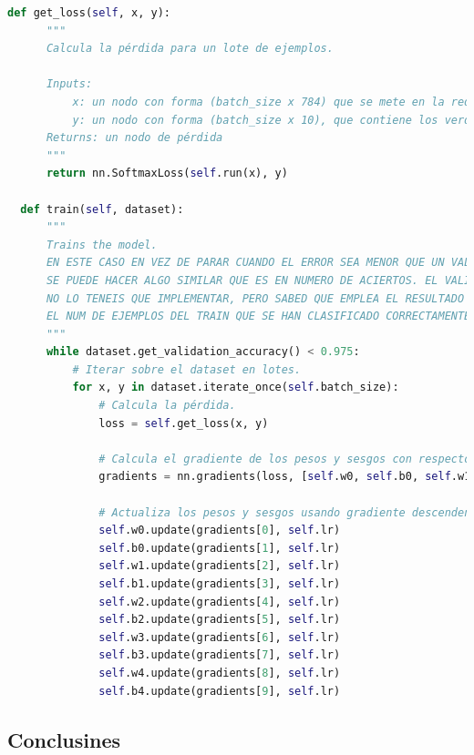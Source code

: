 \documentclass{report}
\begin{document}
\begin{lstlisting}[language=Python, caption=Implementación de la clasificación de dígitos]
  def get_loss(self, x, y):
      """
      Calcula la pérdida para un lote de ejemplos.
      
      Inputs:
          x: un nodo con forma (batch_size x 784) que se mete en la red para obtener las predicciones.
          y: un nodo con forma (batch_size x 10), que contiene los verdaderos valores y que se utilizarán para el entrenamiento.
      Returns: un nodo de pérdida
      """
      return nn.SoftmaxLoss(self.run(x), y) 
  
  def train(self, dataset):
      """
      Trains the model.
      EN ESTE CASO EN VEZ DE PARAR CUANDO EL ERROR SEA MENOR QUE UN VALOR O NO HAYA ERROR (CONVERGENCIA),
      SE PUEDE HACER ALGO SIMILAR QUE ES EN NUMERO DE ACIERTOS. EL VALIDATION ACCURACY
      NO LO TENEIS QUE IMPLEMENTAR, PERO SABED QUE EMPLEA EL RESULTADO DEL SOFTMAX PARA CALCULAR
      EL NUM DE EJEMPLOS DEL TRAIN QUE SE HAN CLASIFICADO CORRECTAMENTE 
      """
      while dataset.get_validation_accuracy() < 0.975:
          # Iterar sobre el dataset en lotes.
          for x, y in dataset.iterate_once(self.batch_size):
              # Calcula la pérdida.
              loss = self.get_loss(x, y)

              # Calcula el gradiente de los pesos y sesgos con respecto a la pérdida.
              gradients = nn.gradients(loss, [self.w0, self.b0, self.w1, self.b1, self.w2, self.b2, self.w3, self.b3, self.w4, self.b4])

              # Actualiza los pesos y sesgos usando gradiente descendente.
              self.w0.update(gradients[0], self.lr)
              self.b0.update(gradients[1], self.lr)
              self.w1.update(gradients[2], self.lr)
              self.b1.update(gradients[3], self.lr)
              self.w2.update(gradients[4], self.lr)
              self.b2.update(gradients[5], self.lr)
              self.w3.update(gradients[6], self.lr)
              self.b3.update(gradients[7], self.lr)
              self.w4.update(gradients[8], self.lr)
              self.b4.update(gradients[9], self.lr)

        \end{lstlisting}
      \subsection*{Conclusines}
\end{document}

